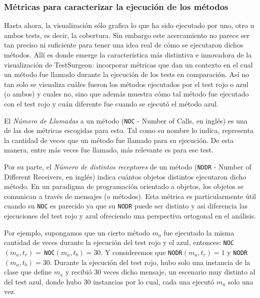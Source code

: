 \subsubsection{Métricas para caracterizar la ejecución de los métodos }

\par Hasta ahora, la visualización sólo grafica lo que ha sido ejecutado por uno, otro u ambos tests, es decir, la cobertura. Sin embargo este acercamiento no parece ser tan preciso ni suficiente para tener una idea real de cómo se ejecutaron dichos métodos. Allí es donde emerge la característica más distintiva e innovadora de la visualización de TestSurgeon: incorporar métricas que dan un contexto en el cual un método fue llamado durante la ejecución de los tests en comparación. Así no tan solo se visualiza cuáles fueron los métodos ejecutados por el test rojo o azul (o ambos) y cuales no, sino que además muestra cómo tal método fue ejecutado con el test rojo y cuán diferente fue cuando se ejecutó el método azul.

\par El \emph{Número de Llamadas} a un método ({\tt NOC} - Number of Calls, en inglés) es una de las dos métricas escogidas para esto. Tal como su nombre lo indica, representa la cantidad de veces que un método fue llamado para su ejecución. De esta manera, entre más veces fue llamado, más relevante es para ese test.

\par Por su parte, el \emph{Número de distintos receptores} de un método ({\tt NODR} - Number of Different Receivers, en inglés) indica cuántos objetos distintos ejecutaron dicho método. En un paradigma de programación orientado a objetos, los objetos se comunican a través de mensajes (o métodos). Esta métrica es particularmente útil cuando su {\tt NOC} es parecido ya que su {\tt NODR} puede ser distinto y asi diferencia las ejecuciones del test rojo y azul ofreciendo una perspectiva ortogonal en el análisis.

\par Por ejemplo, supongamos que un cierto método $m_a$ fue ejecutado la misma cantidad de veces durante la ejecución del test rojo y el azul, entonces: {\tt NOC}$(m_a,t_r) = \,${\tt NOC}$(m_a,t_b) = 30$. Y consideremos que {\tt NODR}$(m_a,t_r) = 1$ y {\tt NODR}$(m_a,t_b) = 30$. Durante la ejecución del test rojo, hubo solo una instancia de la clase que define $m_a$ y recibió 30 veces dicho mensaje, un escenario muy distinto al del test azul, donde hubo 30 instancias por lo cual, cada una ejecutó $m_a$ solo una vez.

